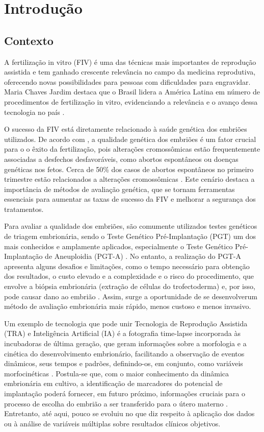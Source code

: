 \chapter[Introdução]{Introdução}

\section{Contexto}

A fertilização in vitro (FIV) é uma das técnicas mais importantes de reprodução assistida e tem ganhado crescente relevância no campo da medicina reprodutiva, oferecendo novas possibilidades para pessoas com dificuldades para engravidar. Maria Chaves Jardim destaca que o Brasil lidera a América Latina em número de procedimentos de fertilização in vitro, evidenciando a relevância e o avanço dessa tecnologia no país \cite{jardim2023}. 

O sucesso da FIV está diretamente relacionado à saúde genética dos embriões utilizados. De acordo com , a qualidade genética dos embriões é um fator crucial para o o êxito da fertilização, pois alterações cromossômicas estão frequentemente associadas a desfechos desfavoráveis, como abortos espontâneos ou doenças genéticas nos fetos. Cerca de 50\% dos casos de abortos espontâneos no primeiro trimestre estão relacionados a alterações cromossômicas \cite{silva2023}. Este cenário destaca a importância de métodos de avaliação genética, que se tornam ferramentas essenciais para aumentar as taxas de sucesso da FIV e melhorar a segurança dos tratamentos.

Para avaliar a qualidade dos embriões, são comumente utilizados testes genéticos de triagem embrionária, sendo o Teste Genético Pré-Implantação (PGT) um dos mais conhecidos e amplamente aplicados, especialmente o Teste Genético Pré-Implantação de Aneuploidia (PGT-A) \cite{yang2024}. No entanto, a realização do PGT-A apresenta alguns desafios e limitações, como o tempo necessário para obtenção dos resultados, o custo elevado e a complexidade e o risco do procedimento, que envolve a biópsia embrionária (extração de células do trofectoderma) e, por isso, pode causar dano ao embrião \cite{yang2024}. Assim, surge a oportunidade de se desenvolverum método de avaliação embrionária mais rápido, menos custoso e menos invasivo.

Um exemplo de tecnologia que pode unir Tecnologia de Reprodução Assistida (TRA) e Inteligência Artificial (IA) é a fotografia time-lapse incorporada às incubadoras de última geração, que geram informações sobre a morfologia e a cinética do desenvolvimento embrionário, facilitando a observação de eventos dinâmicos, seus tempos e padrões, definindo-os, em conjunto, como variáveis morfocinéticas \cite{meseguer2011}. Postula-se que, com o maior conhecimento da dinâmica embrionária em cultivo, a identificação de marcadores do potencial de implantação poderá fornecer, em futuro próximo, informações cruciais para o processo de escolha do embrião a ser transferido para o útero materno \cite{luong2023}. Entretanto, até aqui, pouco se evoluiu no que diz respeito à aplicação dos dados ou à análise de variáveis múltiplas sobre resultados clínicos objetivos.

